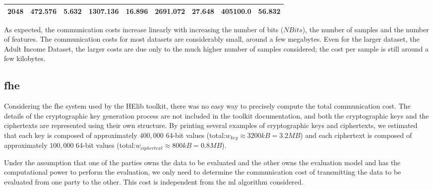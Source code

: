 \begin{table}[H]
\begin{tabular}{|c|l|l|l|l|l|l|l|l|}
\textbf{2048}                   & 472.576                                                                          & 5.632                                                                        & 1307.136                                                                         & 16.896                                                                       & 2691.072                                                                         & 27.648                                                                       & 405100.0                                                                         & 56.832                                                                       \\ \hline
\end{tabular}
\end{table}


As expected, the communication costs increase linearly with increasing the number of bits ($NBits$), the number of samples and the number of features. The communication costs for most datasets are considerably small, around a few megabytes. Even for the larger dataset, the Adult Income Dataset, the larger costs are due only to the much higher number of samples considered; the cost per sample is still around a few kilobytes.



\subsection{\acl{fhe}}

Considering the \ac{fhe} system used by the HElib toolkit, there was no easy way to precisely compute the total communication cost. The details of the cryptographic key generation process are not included in the toolkit documentation, and both the cryptographic keys and the ciphertexts are represented using their own structure. By printing several examples of cryptographic keys and ciphertexts, we estimated that each key is composed of approximately $400,000$ 64-bit values (total:$w_{key}\approx 3200kB=3.2MB$) and each ciphertext is composed of approximately $100,000$ 64-bit values (total:$w_{ciphertext}\approx 800kB=0.8MB$).

Under the assumption that one of the parties owns the data to be evaluated and the other owns the evaluation model and has the computational power to perform the evaluation, we only need to determine the communication cost of transmitting the data to be evaluated from one party to the other. This cost is independent from the \ac{ml} algorithm considered.

